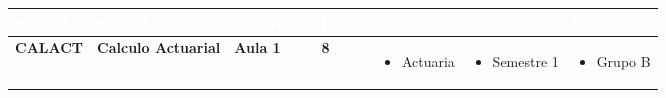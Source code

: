 \documentclass{article}
\begin{document}
\begin{tabular}{|>{\centering\arraybackslash}m{2cm}|>{\centering\arraybackslash}m{4cm}|>{\centering\arraybackslash}m{2cm}|>{\centering\arraybackslash}m{2cm}|>{\centering\arraybackslash}m{2cm}|>{\centering\arraybackslash}m{2cm}|>{\centering\arraybackslash}m{2cm}|}
\hline
\cellcolor{headercolor}\textcolor{white}{\textbf{Symbol}} & 
\cellcolor{headercolor}\textcolor{white}{\textbf{Subject}} & 
\cellcolor{headercolor}\textcolor{white}{\textbf{Classroom}} & 
\cellcolor{headercolor}\textcolor{white}{\textbf{Hours}} & 
\cellcolor{headercolor}\textcolor{white}{\textbf{Career}} & 
\cellcolor{headercolor}\textcolor{white}{\textbf{Semester}} & 
\cellcolor{headercolor}\textcolor{white}{\textbf{Group}} \\
\hline
\cellcolor{subjectcolor} \textbf{CALACT} & 
\textbf{Calculo Actuarial} & 
\textbf{Aula 1} & 
\textbf{8} & 
\begin{itemize}[left=0pt,align=left]\item Actuaria 
\end{itemize} & 
\begin{itemize}[left=0pt,align=left]\item Semestre 1 
\end{itemize} & 
\begin{itemize}[left=0pt,align=left]\item Grupo B 
\end{itemize} \\
\hline
\end{tabular}

\newpage
\end{document}
